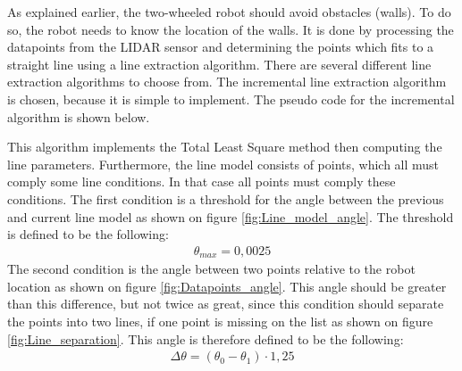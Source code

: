 \documentclass[../Head/Main.tex]{subfiles}
\begin{document}
As explained earlier, the two-wheeled robot should avoid obstacles (walls). To do so, the robot needs to know the location of the walls. It is done by processing the datapoints from the LIDAR sensor and determining the points which fits to a straight line using a line extraction algorithm. There are several different line extraction algorithms to choose from. The incremental line extraction algorithm is chosen, because it is simple to implement. The pseudo code for the incremental algorithm is shown below. \par

This algorithm implements the Total Least Square method then computing the line parameters. Furthermore, the line model consists of points, which all must comply some line conditions. In that case all points must comply these conditions. The first condition is a threshold for the angle between the previous and current line model as shown on figure \ref{fig:Line_model_angle}. The threshold is defined to be the following:
\begin{align*}
	\theta_{max} = 0,0025
\end{align*}
The second condition is the angle between two points relative to the robot location as shown on figure \ref{fig:Datapoints_angle}. This angle should be greater than this difference, but not twice as great, since this condition should separate the points into two lines, if one point is missing on the list as shown on figure \ref{fig:Line_separation}. This angle is therefore defined to be the following:
\begin{align*}
	\Delta\theta = \left(\theta_0 - \theta_1\right)\cdot 1,25
\end{align*}

\end{document}
